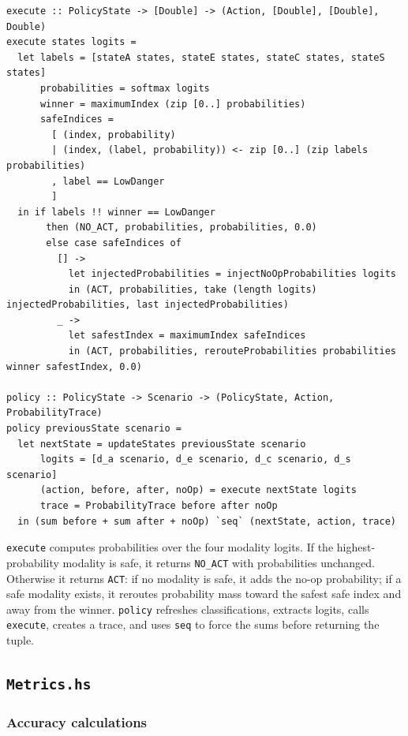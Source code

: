 \documentclass[11pt]{article}
\begin{document}
\begin{lstlisting}
execute :: PolicyState -> [Double] -> (Action, [Double], [Double], Double)
execute states logits =
  let labels = [stateA states, stateE states, stateC states, stateS states]
      probabilities = softmax logits
      winner = maximumIndex (zip [0..] probabilities)
      safeIndices =
        [ (index, probability)
        | (index, (label, probability)) <- zip [0..] (zip labels probabilities)
        , label == LowDanger
        ]
  in if labels !! winner == LowDanger
       then (NO_ACT, probabilities, probabilities, 0.0)
       else case safeIndices of
         [] ->
           let injectedProbabilities = injectNoOpProbabilities logits
           in (ACT, probabilities, take (length logits) injectedProbabilities, last injectedProbabilities)
         _ ->
           let safestIndex = maximumIndex safeIndices
           in (ACT, probabilities, rerouteProbabilities probabilities winner safestIndex, 0.0)

policy :: PolicyState -> Scenario -> (PolicyState, Action, ProbabilityTrace)
policy previousState scenario =
  let nextState = updateStates previousState scenario
      logits = [d_a scenario, d_e scenario, d_c scenario, d_s scenario]
      (action, before, after, noOp) = execute nextState logits
      trace = ProbabilityTrace before after noOp
  in (sum before + sum after + noOp) `seq` (nextState, action, trace)
\end{lstlisting}

\texttt{execute} computes probabilities over the four modality logits. If the
highest-probability modality is safe, it returns \texttt{NO\_ACT} with
probabilities unchanged. Otherwise it returns \texttt{ACT}: if no modality is
safe, it adds the no-op probability; if a safe modality exists, it reroutes
probability mass toward the safest safe index and away from the winner.
\texttt{policy} refreshes classifications, extracts logits, calls
\texttt{execute}, creates a trace, and uses \texttt{seq} to force the sums
before returning the tuple.

\subsection{\texttt{Metrics.hs}}

\subsubsection{Accuracy calculations}
\end{document}
